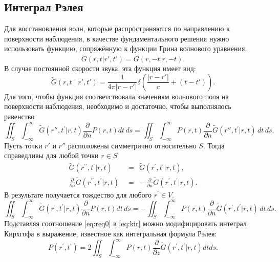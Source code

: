 \documentclass[a4paper, fontsize=14pt]{article}
\begin{document}
	\subsection{Интеграл Рэлея}
	Для восстановления волн, которые распространяются по направлению к поверхности наблюдения, в качестве фундаментального решения нужно использовать функцию, сопряжённую к функции Грина волнового уравнения.
	\begin{equation}
	\widetilde{G}( r,t|r',t')=G(r,-t|r,-t).
	\end{equation}
	В случае постоянной скорости звука, эта функция имеет вид:
	\begin{equation}
	\widetilde{G}(r,t\mid r',t')=\frac{1}{4\pi\left|r-r'\right|}\delta\left(\frac{\left|r-r'\right|}{c}+(t-t')\right).
	\end{equation}
	Для того, чтобы функция соответствовала значениям волнового поля на поверхности наблюдения, необходимо и достаточно, чтобы выполнялось равенство
	\begin{equation}
	\iint_{S}\int_{-\infty}^{\infty}{\widetilde{G}}\left(r'',t^{\prime}|r,t\right){\frac{\partial}{\partial n}}P(r,t)d t\,d s = \iint_{S}\int_{-\infty}^{\infty}P(r,t){\frac{\partial}{\partial n}}{\widetilde{G}}\left(r'',t^{\prime}|r,t\right)\,d t\,d s.
	\end{equation}
	Пусть точки $r'$ и $r''$ расположены симметрично относительно $S$. Тогда справедливы для любой точки $r\in S$
	\begin{align}
		\widetilde{{{G}}}\left({r}^{\prime\prime},t^{\prime}|{r},t\right)~~&=~~\widetilde{G}\left({r}^{\prime},t^{\prime}|{r},t\right), \\
		\frac{\partial}{\partial n}\widetilde G\left({ r}^{\prime\prime},t^{\prime}|{ r},t\right)~&=~-\frac{\partial}{\partial n}\widetilde G\left({ r}^{\prime},t^{\prime}|{ r},t\right).
	\end{align}
	В результате получается тождество для любого ${ r}^{\prime}\in V$.
	\begin{equation}
	\iint_{S}\int_{-\infty}^{\infty}\widetilde{G}\left({r}^{\prime},t^{\prime}|{r},t\right)\frac{\partial}{\partial n}P({r},t)d t\,d s = -\iint_{S}\int_{-\infty}^{\infty}P({ r},t){\frac{\partial}{\partial n}}\widetilde{G}\left({ r}^{\prime},t^{\prime}|{ r},t\right)\,d t\,d s.
	\label{eq:req0}
	\end{equation}
Подставляя соотношение \eqref{eq:req0} в \eqref{eq:kir} можно модифицировать интеграл Кирхгофа в выражение, 
известное как интегральная формула Рэлея:
\begin{equation}
P({ r}^{\prime},t^{\prime})=2\iint_{S}\int_{-\infty}^{\infty}P({ r},t)\frac{\partial}{\partial z}\widetilde{G}\left({ r}^{\prime},t^{\prime}|{ r},t\right)d t d s.
\label{eq:rayleighorig}
\end{equation}
\end{document}
